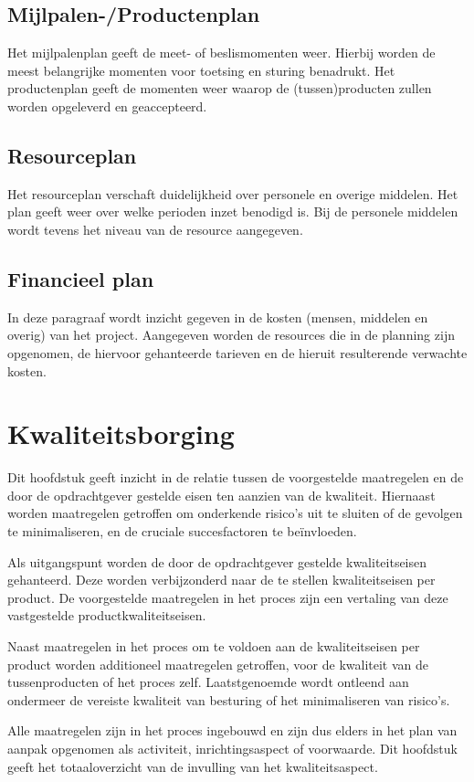 \documentclass{article}
\begin{document}
\subsection{Mijlpalen-/Productenplan}
Het mijlpalenplan geeft de meet- of beslismomenten weer.
Hierbij worden de meest belangrijke momenten voor toetsing en sturing benadrukt.
Het productenplan geeft de momenten weer waarop de (tussen)producten zullen worden opgeleverd en geaccepteerd.

\subsection{Resourceplan}
Het resourceplan verschaft duidelijkheid over personele en overige middelen.
Het plan geeft weer over welke perioden inzet benodigd is. Bij de personele middelen wordt tevens het niveau van de resource aangegeven.

\subsection{Financieel plan}
In deze paragraaf wordt inzicht gegeven in de kosten (mensen, middelen en overig) van het project.
Aangegeven worden de resources die in de planning zijn opgenomen,
de hiervoor gehanteerde tarieven en de hieruit resulterende verwachte kosten.


\section{Kwaliteitsborging}
Dit hoofdstuk geeft inzicht in de relatie tussen de voorgestelde maatregelen
en de door de opdrachtgever gestelde eisen ten aanzien van de kwaliteit.
Hiernaast worden maatregelen getroffen om onderkende risico's uit te sluiten of de gevolgen te minimaliseren,
en de cruciale succesfactoren te beïnvloeden.

Als uitgangspunt worden de door de opdrachtgever gestelde kwaliteitseisen gehanteerd.
Deze worden verbijzonderd naar de te stellen kwaliteitseisen per product.
De voorgestelde maatregelen in het proces zijn een vertaling van deze vastgestelde productkwaliteitseisen.

Naast maatregelen in het proces om te voldoen aan de kwaliteitseisen per product worden additioneel maatregelen getroffen,
voor de kwaliteit van de tussenproducten of het proces zelf.
Laatstgenoemde wordt ontleend aan ondermeer de vereiste kwaliteit van besturing of het minimaliseren van risico's.

Alle maatregelen zijn in het proces ingebouwd en zijn dus elders in het plan van aanpak opgenomen als activiteit,
inrichtingsaspect of voorwaarde. Dit hoofdstuk geeft het totaaloverzicht van de invulling van het kwaliteitsaspect.
\end{document}

